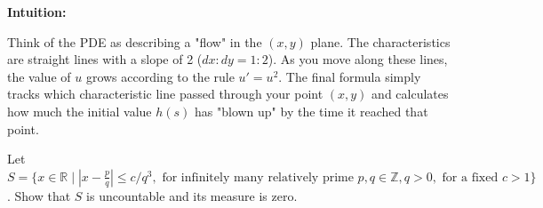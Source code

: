 \begin{solution}
\textbf{Intuition:}

Think of the PDE as describing a "flow" in the $(x, y)$ plane. The characteristics are straight lines with a slope of 2 ($dx:dy = 1:2$). As you move along these lines, the value of $u$ grows according to the rule $u' = u^2$. The final formula simply tracks which characteristic line passed through your point $(x, y)$ and calculates how much the initial value $h(s)$ has "blown up" by the time it reached that point.


\end{solution}

\vspace{2em}

\begin{exercise}
\label{analysis:2011:10}
Let $S = \{x\in\mathbb{R} \mid |x-\frac{p}{q}|\leq c/q^3, \text{ for infinitely many relatively prime } p,q\in\mathbb{Z}, q>0, \text{ for a fixed } c>1\}$. Show that $S$ is uncountable and its measure is zero.
\end{exercise}

